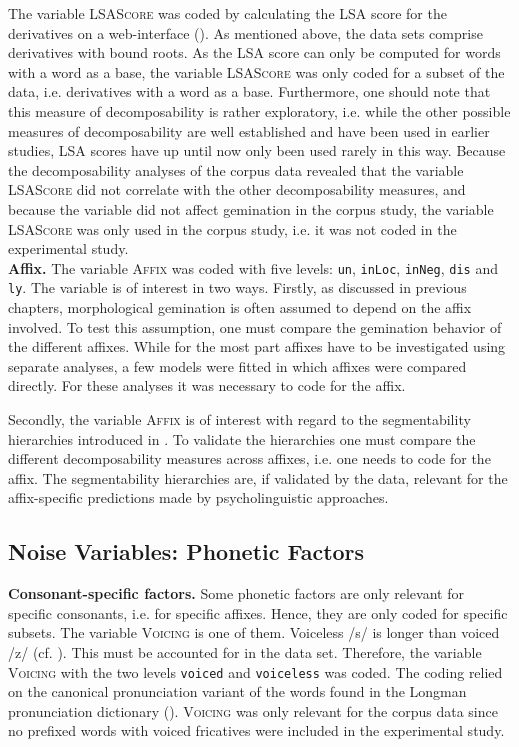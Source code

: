 The variable \textsc{LSAScore} was coded by calculating the LSA score for the derivatives on a web-interface (\citealt{UniversityofColoradoBoulder.25.06.2015}). %
As mentioned above, the data sets comprise derivatives with bound roots. As the LSA score can only be computed for words with a word as a base, the variable \textsc{LSAScore} was only coded for a subset of the data, i.e. derivatives with a word as a base. Furthermore, one should note that this measure of decomposability is rather exploratory, i.e. while the other possible measures of decomposability are well established and have been used in earlier studies, LSA scores have up until now only been used rarely in this way. Because the decomposability analyses of the corpus data revealed that the variable \textsc{LSAScore} did not correlate with the other decomposability measures, and because the variable did not affect gemination in the corpus study, the variable \textsc{LSAScore} was only used in the corpus study, i.e. it was not coded in the experimental study.\\

\textbf{Affix.} The variable \textsc{Affix} was coded with five levels: \texttt{un}, \texttt{inLoc}, \texttt{inNeg}, \texttt{dis} and \texttt{ly}. The variable is of interest in two ways. 
Firstly, as discussed in previous chapters, morphological gemination is often assumed to depend on the affix involved. To test this assumption, one must compare the gemination behavior of the different affixes. While for the most part affixes have to be investigated using separate analyses, a few models were fitted in which affixes were compared directly. For these analyses it was necessary to code for the affix.


Secondly, the variable \textsc{Affix} is of interest with regard to the segmentability hierarchies introduced in . To validate the hierarchies one must compare the different decomposability measures across affixes, i.e. one needs to code for the affix. The segmentability hierarchies are, if validated by the data, relevant for the affix-specific predictions made by psycholinguistic approaches. 


\subsection{Noise Variables: Phonetic Factors}

\textbf{Consonant-specific factors.} Some phonetic factors are only relevant for specific consonants, i.e. for specific affixes. Hence, they are only coded for specific subsets. The variable \textsc{Voicing} is one of them. Voiceless /s/ is longer than voiced /z/ (cf. \citealt{Umeda.1977}). This must be accounted for in the data set. Therefore, the variable \textsc{Voicing} with the two levels \texttt{voiced} and \texttt{voiceless} was coded. The coding relied on the canonical pronunciation variant of the words found in the Longman pronunciation dictionary (\citealt{Wells.2008}). \textsc{Voicing} was only relevant for the corpus data since no prefixed words with voiced fricatives were included in the experimental study.

